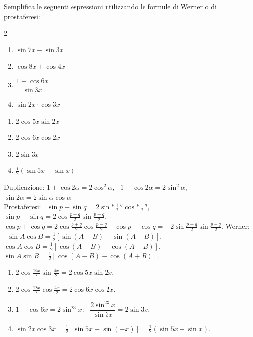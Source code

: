 
\begin{question}[ID=3.5, subtitle={Formule di Werner e prostaferesi — serie 5}, tags={goniometria, prostaferesi, Werner}, difficulty=media]
Semplifica le seguenti espressioni utilizzando le formule di Werner o di prostaferesi:
\begin{multicols}{2}
\begin{enumerate}
\item $\sin 7x - \sin 3x$
\item $\cos 8x + \cos 4x$
\item $\dfrac{1 - \cos 6x}{\sin 3x}$
\item $\sin 2x \cdot \cos 3x$
\end{enumerate}
\end{multicols}
\begin{solution}
\begin{enumerate}
    \item $2\cos5x\sin2x$
    \item $2\cos6x\cos2x$
    \item $2\sin3x$
    \item $\tfrac12(\sin5x-\sin x)$
\end{enumerate}
\end{solution}
\begin{explanation}
Duplicazione: $1+\cos2\alpha=2\cos^2\alpha$, \ $1-\cos2\alpha=2\sin^2\alpha$, \ $\sin2\alpha=2\sin\alpha\cos\alpha$. \\
Prostaferesi: \ $\sin p+\sin q=2\sin\tfrac{p+q}{2}\cos\tfrac{p-q}{2}$, \ $\sin p-\sin q=2\cos\tfrac{p+q}{2}\sin\tfrac{p-q}{2}$, \\
$\cos p+\cos q=2\cos\tfrac{p+q}{2}\cos\tfrac{p-q}{2}$, \ $\cos p-\cos q=-2\sin\tfrac{p+q}{2}\sin\tfrac{p-q}{2}$.
Werner: \ $\sin A\cos B=\tfrac12[\sin(A+B)+\sin(A-B)]$, \ $\cos A\cos B=\tfrac12[\cos(A+B)+\cos(A-B)]$, \ $\sin A\sin B=\tfrac12[\cos(A-B)-\cos(A+B)]$.
\begin{enumerate}
    \item $2\cos\tfrac{10x}{2}\sin\tfrac{4x}{2}=2\cos5x\sin2x$.
    \item $2\cos\tfrac{12x}{2}\cos\tfrac{4x}{2}=2\cos6x\cos2x$.
    \item $1-\cos6x=2\sin^23x$: \ $\dfrac{2\sin^23x}{\sin3x}=2\sin3x$.
    \item $\sin2x\cos3x=\tfrac12\left[\sin5x+\sin(-x)\right]=\tfrac12(\sin5x-\sin x)$.
\end{enumerate}
\end{explanation}
\end{question}


